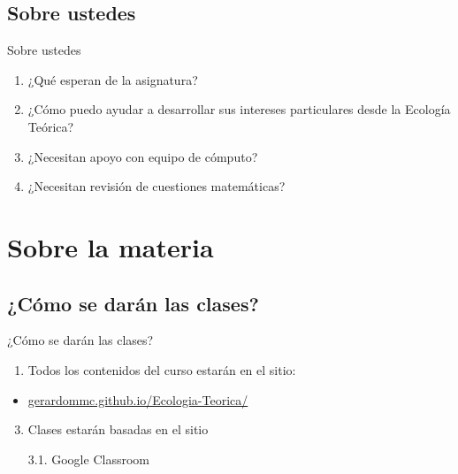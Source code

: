 \documentclass[
  11pt,
  ignorenonframetext,
]{beamer}
\providecommand{\tightlist}{%
  \setlength{\itemsep}{0pt}\setlength{\parskip}{0pt}}
\begin{document}
\hypertarget{sobre-ustedes}{%
\subsection{Sobre ustedes}\label{sobre-ustedes}}

\begin{frame}{Sobre ustedes}
\begin{enumerate}
\tightlist
\item
  ¿Qué esperan de la asignatura?
\item
  ¿Cómo puedo ayudar a desarrollar sus intereses particulares desde la
  Ecología Teórica?
\item
  ¿Necesitan apoyo con equipo de cómputo?
\item
  ¿Necesitan revisión de cuestiones matemáticas?
\end{enumerate}
\end{frame}

\hypertarget{sobre-la-materia}{%
\section{Sobre la materia}\label{sobre-la-materia}}

\hypertarget{cuxf3mo-se-daruxe1n-las-clases}{%
\subsection{¿Cómo se darán las
clases?}\label{cuxf3mo-se-daruxe1n-las-clases}}

\begin{frame}{¿Cómo se darán las clases?}
\begin{enumerate}
\tightlist
\item
  Todos los contenidos del curso estarán en el sitio:
\end{enumerate}

\begin{itemize}
\tightlist
\item
  \href{https://gerardommc.github.io/Ecologia-Teorica/}{gerardommc.github.io/Ecologia-Teorica/}
\end{itemize}

\begin{enumerate}
\setcounter{enumi}{2}
\item
  Clases estarán basadas en el sitio

  3.1. Google Classroom
\end{enumerate}
\end{frame}
\end{document}
